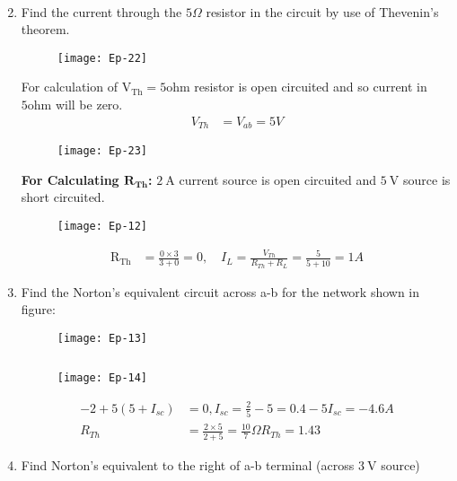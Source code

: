 \begin{enumerate}
\begin{answer}
\begin{align*}
		\end{align*}
	\end{answer}
	\item Find the current through the $5 \Omega$ resistor in the circuit by use of Thevenin's theorem.
	\begin{figure}[H]
		\centering
		\texttt{[image: Ep-22]}
	\end{figure}
	\begin{answer}
		For calculation of $\mathrm{V}_{\mathrm{Th}}=5 \mathrm{ohm}$ resistor is open circuited and so current in $5 \mathrm{ohm}$ will be zero.
		\begin{align*}
		V_{T h}&=V_{a b}=5 V
		\end{align*}
		\begin{figure}[H]
			\centering
			\texttt{[image: Ep-23]}
		\end{figure}
		\textbf{For Calculating $\mathbf{R}_{\mathbf{Th}}$:} $2 \mathrm{~A}$ current source is open circuited and $5 \mathrm{~V}$ source is short circuited.
		\begin{figure}[H]
			\centering
			\texttt{[image: Ep-12]}
		\end{figure}
		\begin{align*}
		\mathrm{R}_{\mathrm{Th}}&=\frac{0 \times 3}{3+0}=0, \quad I_{L}=\frac{V_{T h}}{R_{T h}+R_{L}}=\frac{5}{5+10}=1 A
		\end{align*}
	\end{answer}
	\item Find the Norton's equivalent circuit across a-b for the network shown in figure:
	\begin{figure}[H]
		\centering
		\texttt{[image: Ep-13]}
	\end{figure}
	\begin{answer}$\left. \right. $\\
		\begin{figure}[H]
			\centering
			\texttt{[image: Ep-14]}
		\end{figure}
		\begin{align*}
		-2+5\left(5+I_{s c}\right)&=0, I_{s c}=\frac{2}{5}-5=0.4-5 I_{s c}=-4.6 A \\
		R_{T h}&=\frac{2 \times 5}{2+5}=\frac{10}{7} \Omega R_{T h}=1.43
		\end{align*}
	\end{answer}
	\item Find Norton's equivalent to the right of a-b terminal (across $3 \mathrm{~V}$ source)

\end{enumerate}
